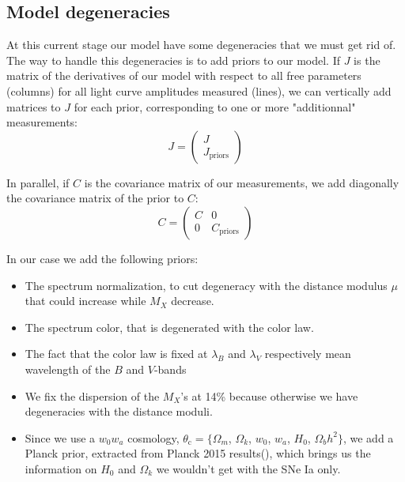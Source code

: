 \documentclass[\docopts]{\docclass}
\begin{document}

\subsection{Model degeneracies}
\label{ssec::model_deg}

At this current stage our model have some degeneracies that we must get rid of.
The way to handle this degeneracies is to add priors to our model.
If $J$ is the matrix of the derivatives  of our model with respect to all free parameters (columns) for all light curve amplitudes measured (lines), we can vertically add matrices to $J$ for each prior, corresponding to one or more "additionnal" measurements:
\begin{equation}
J =
\begin{pmatrix}
  J \\
  J_\text{priors}
\end{pmatrix} 
\end{equation}

In parallel, if $C$ is the covariance matrix of our measurements, we add diagonally the covariance matrix of the prior to $C$:
\begin{equation}
C =
\begin{pmatrix}
  C & 0 \\
  0 & C_\text{priors}
\end{pmatrix} 
\end{equation}

In our case we add the following priors:
\begin{itemize}
\item The spectrum normalization, to cut degeneracy with the distance modulus $\mu$ that could increase while $M_X$ decrease.
\item The spectrum color, that is degenerated with the color law.
\item The fact that the color law is fixed at $\lambda_B$ and $\lambda_V$ respectively mean wavelength of the $B$ and $V$-bands
\item We fix the dispersion of the $M_X$'s at 14\% because otherwise we have degeneracies with the distance moduli.
\item Since we use a $w_0w_a$ cosmology, $\theta_\text{c} = \{ \Omega_m$, $\Omega_k$, $w_0$, $w_a$, $H_0$, $\Omega_bh^2 \}$, we add a Planck prior, extracted from Planck 2015 results(\cite{1502.01589}), which brings us the information on $H_0$ and $\Omega_k$ we wouldn't get with the SNe Ia only.
\end{itemize}
\end{document}
